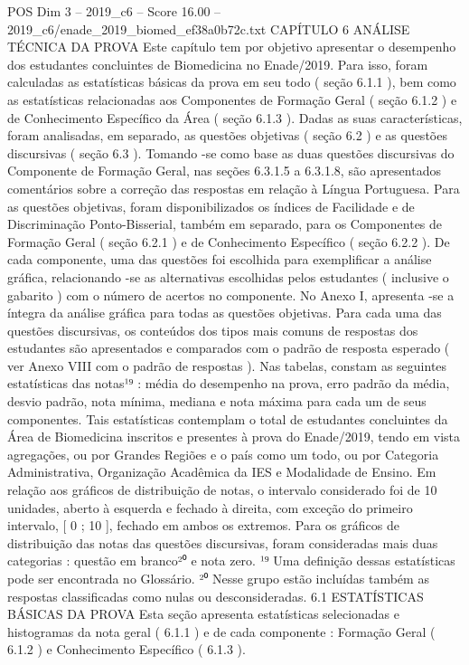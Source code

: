 \begin{textsample}{POS Dim 3 – 2019\_c6 – Score 16.00 – 2019\_c6/enade\_2019\_biomed\_ef38a0b72c.txt}  \label{ex:f3_pos_014}
CAPÍTULO 6 ANÁLISE TÉCNICA DA PROVA Este capítulo tem por objetivo apresentar o desempenho dos estudantes concluintes de Biomedicina no Enade/2019.
Para isso, foram calculadas as estatísticas básicas da prova em seu todo ( seção 6.1.1 ), bem como as estatísticas relacionadas aos Componentes de Formação Geral ( seção 6.1.2 ) e de Conhecimento Específico da Área ( seção 6.1.3 ).
Dadas as suas características, foram analisadas, em separado, as questões objetivas ( seção 6.2 ) e as questões discursivas ( seção 6.3 ).
Tomando -se como base as duas questões discursivas do Componente de Formação Geral, nas seções 6.3.1.5 a 6.3.1.8, são apresentados comentários sobre a correção das respostas em relação à Língua Portuguesa.
Para as questões objetivas, foram disponibilizados os índices de Facilidade e de Discriminação Ponto-Bisserial, também em separado, para os Componentes de Formação Geral ( seção 6.2.1 ) e de Conhecimento Específico ( seção 6.2.2 ).
De cada componente, uma das questões foi escolhida para exemplificar a análise gráfica, relacionando -se as alternativas escolhidas pelos estudantes ( inclusive o gabarito ) com o número de acertos no componente.
No Anexo I, apresenta -se a íntegra da análise gráfica para todas as questões objetivas.
Para cada uma das questões discursivas, os conteúdos dos tipos mais comuns de respostas dos estudantes são apresentados e comparados com o padrão de resposta esperado ( ver Anexo VIII com o padrão de respostas ).
Nas tabelas, constam as seguintes estatísticas das notas¹⁹ : média do desempenho na prova, erro padrão da média, desvio padrão, nota mínima, mediana e nota máxima para cada um de seus componentes.
Tais estatísticas contemplam o total de estudantes concluintes da Área de Biomedicina inscritos e presentes à prova do Enade/2019, tendo em vista agregações, ou por Grandes Regiões e o país como um todo, ou por Categoria Administrativa, Organização Acadêmica da IES e Modalidade de Ensino.
Em relação aos gráficos de distribuição de notas, o intervalo considerado foi de 10 unidades, aberto à esquerda e fechado à direita, com exceção do primeiro intervalo, [ 0 ; 10 ], fechado em ambos os extremos.
Para os gráficos de distribuição das notas das questões discursivas, foram consideradas mais duas categorias : questão em branco²⁰ e nota zero. ¹⁹ Uma definição dessas estatísticas pode ser encontrada no Glossário. ²⁰ Nesse grupo estão incluídas também as respostas classificadas como nulas ou desconsideradas. 6.1 ESTATÍSTICAS BÁSICAS DA PROVA Esta seção apresenta estatísticas selecionadas e histogramas da nota geral ( 6.1.1 ) e de cada componente : Formação Geral ( 6.1.2 ) e Conhecimento Específico ( 6.1.3 ).

\end{textsample}
